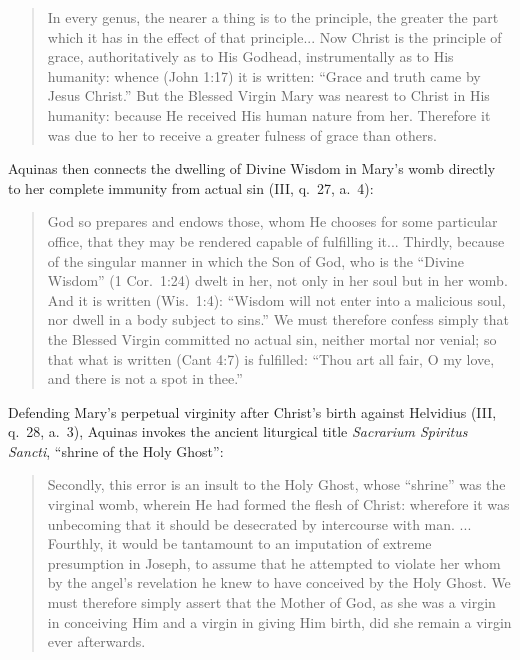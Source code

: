 \begin{quote}\small
In every genus, the nearer a thing is to the principle, the greater the part which it has in the effect of that principle... Now Christ is the principle of grace, authoritatively as to His Godhead, instrumentally as to His humanity: whence (John 1:17) it is written: ``Grace and truth came by Jesus Christ.'' But the Blessed Virgin Mary was nearest to Christ in His humanity: because He received His human nature from her. Therefore it was due to her to receive a greater fulness of grace than others.
\end{quote}

Aquinas then connects the dwelling of Divine Wisdom in Mary's womb directly to her complete immunity from actual sin (III, q.\ 27, a.\ 4):

\begin{quote}\small
God so prepares and endows those, whom He chooses for some particular office, that they may be rendered capable of fulfilling it... Thirdly, because of the singular manner in which the Son of God, who is the ``Divine Wisdom'' (1 Cor.\ 1:24) dwelt in her, not only in her soul but in her womb. And it is written (Wis.\ 1:4): ``Wisdom will not enter into a malicious soul, nor dwell in a body subject to sins.'' We must therefore confess simply that the Blessed Virgin committed no actual sin, neither mortal nor venial; so that what is written (Cant 4:7) is fulfilled: ``Thou art all fair, O my love, and there is not a spot in thee.''
\end{quote}

Defending Mary's perpetual virginity after Christ's birth against Helvidius (III, q.\ 28, a.\ 3), Aquinas invokes the ancient liturgical title \textit{Sacrarium Spiritus Sancti}, ``shrine of the Holy Ghost'':

\begin{quote}\small
Secondly, this error is an insult to the Holy Ghost, whose ``shrine'' was the virginal womb, wherein He had formed the flesh of Christ: wherefore it was unbecoming that it should be desecrated by intercourse with man. ... Fourthly, it would be tantamount to an imputation of extreme presumption in Joseph, to assume that he attempted to violate her whom by the angel's revelation he knew to have conceived by the Holy Ghost. We must therefore simply assert that the Mother of God, as she was a virgin in conceiving Him and a virgin in giving Him birth, did she remain a virgin ever afterwards.
\end{quote}

